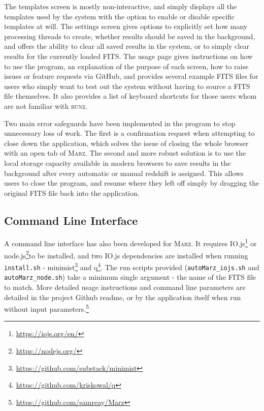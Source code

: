 \documentclass[5p]{elsarticle}
\newcommand{\runz}{\textsc{runz}}
\newcommand{\marz}{\textsc{Marz}}
\begin{document}
The templates screen is mostly non-interactive, and simply displays all the templates used by the system with the option to enable or disable specific templates at will. The settings screen gives options to explicitly set how many processing threads to create, whether results should be saved in the background, and offers the ability to clear all saved results in the system, or to simply clear results for the currently loaded FITS. The usage page gives instructions on how to use the program, an explanation of the purpose of each screen, how to raise issues or feature requests via GitHub, and provides several example FITS files for users who simply want to test out the system without having to source a FITS file themselves. It also provides a list of keyboard shortcuts for those users whom are not familiar with \runz{}.

Two main error safeguards have been implemented in the program to stop unnecessary loss of work. The first is a confirmation request when attempting to close down the application, which solves the issue of closing the whole browser with an open tab of \marz{}. The second and more robust solution is to use the local storage capacity available in modern browsers to save results in the background after every automatic or manual redshift is assigned. This allows users to close the program, and resume where they left off simply by dragging the original FITS file back into the application.\\






\subsection{Command Line Interface} \label{sec:commandline}

A command line interface has also been developed for \marz{}. It requires IO.js\footnote{\url{https://iojs.org/en/}} or node.js\footnote{\url{https://nodejs.org/}}to be installed, and two IO.js dependencies are installed when running \verb;install.sh; - minimist\footnote{\url{https://github.com/substack/minimist}} and q\footnote{\url{https://github.com/kriskowal/q}}. The run scripts provided (\verb;autoMarz_iojs.sh; and \verb;autoMarz_node.sh;) take a minimum single argument - the name of the FITS file to match. More detailed usage instructions and command line parameters are detailed in the project Github readme, or by the application itself when run without input parameters.\footnote{\url{https://github.com/samreay/Marz}}\\
\end{document}
